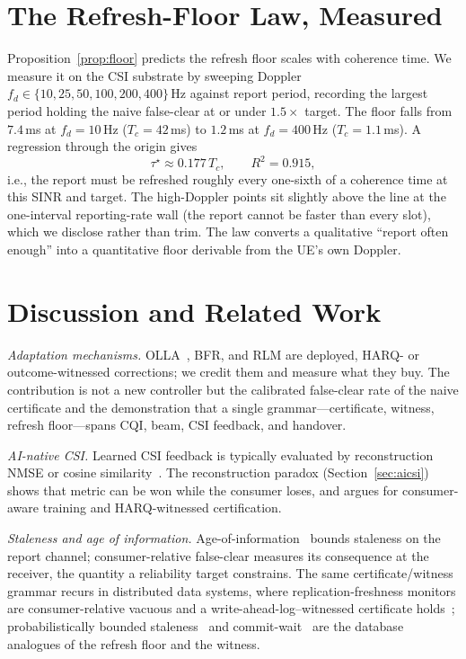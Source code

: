\documentclass[lettersize,onecolumn]{IEEEtran}
\theoremstyle{remark}
\begin{document}
\section{The Refresh-Floor Law, Measured}\label{sec:floor}
Proposition~\ref{prop:floor} predicts the refresh floor scales with coherence
time. We measure it on the CSI substrate by sweeping Doppler
$f_d\in\{10,25,50,100,200,400\}$\,Hz against report period, recording the
largest period holding the naive false-clear at or under $1.5\times$ target.
The floor falls from $7.4$\,ms at $f_d=10$\,Hz ($T_c=42$\,ms) to $1.2$\,ms at
$f_d=400$\,Hz ($T_c=1.1$\,ms). A regression through the origin gives
\[
\tau^\star \approx 0.177\,T_c, \qquad R^2 = 0.915,
\]
i.e., the report must be refreshed roughly every one-sixth of a coherence time
at this SINR and target. The high-Doppler points sit slightly above the line at
the one-interval reporting-rate wall (the report cannot be faster than every
slot), which we disclose rather than trim. The law converts a qualitative
``report often enough'' into a quantitative floor derivable from the UE's own
Doppler.

\section{Discussion and Related Work}
\emph{Adaptation mechanisms.} OLLA~\cite{sampath1997olla}, BFR, and RLM are
deployed, HARQ- or outcome-witnessed corrections; we credit them and measure
what they buy. The contribution is not a new controller but the calibrated
false-clear rate of the naive certificate and the demonstration that a single
grammar---certificate, witness, refresh floor---spans CQI, beam, CSI feedback,
and handover.

\emph{AI-native CSI.} Learned CSI feedback is typically evaluated by
reconstruction NMSE or cosine similarity~\cite{wen2018csinet}. The reconstruction
paradox (Section~\ref{sec:aicsi}) shows that metric can be won while the consumer
loses, and argues for consumer-aware training and HARQ-witnessed certification.

\emph{Staleness and age of information.} Age-of-information~\cite{kaul2012aoi}
bounds staleness on the report channel; consumer-relative false-clear measures
its consequence at the receiver, the quantity a reliability target constrains.
The same certificate/witness grammar recurs in distributed data systems, where
replication-freshness monitors are consumer-relative vacuous and a
write-ahead-log--witnessed certificate holds~\cite{bond_ot}; probabilistically
bounded staleness~\cite{bailis2012pbs} and commit-wait~\cite{corbett2012spanner}
are the database analogues of the refresh floor and the witness.
\end{document}
